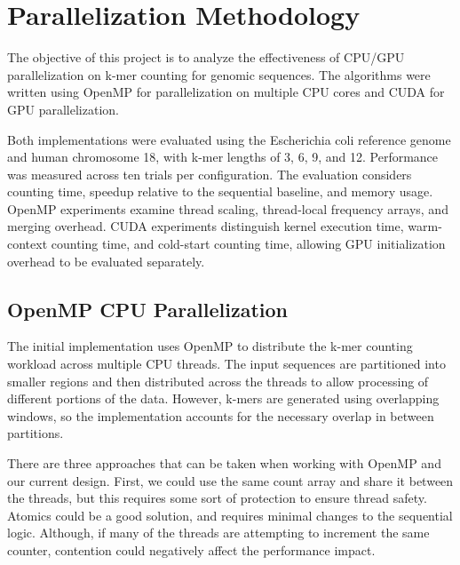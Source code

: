 \documentclass{article}
\begin{document}
\section{Parallelization Methodology}

\vspace{\baselineskip}

The objective of this project is to analyze the effectiveness of CPU/GPU parallelization on k-mer counting for genomic sequences. 
The algorithms were written using OpenMP for parallelization on multiple CPU cores and CUDA for GPU parallelization. 

\vspace{\baselineskip}


Both implementations were evaluated using the Escherichia coli reference genome and human chromosome 18, with k-mer lengths of 3, 6, 9, and 12. 
Performance was measured across ten trials per configuration. The evaluation considers counting time, speedup relative to the sequential baseline, and memory usage. 
OpenMP experiments examine thread scaling, thread-local frequency arrays, and merging overhead. CUDA experiments distinguish kernel execution time, warm-context counting time, 
and cold-start counting time, allowing GPU initialization overhead to be evaluated separately.

\vspace{\baselineskip}



\subsection{OpenMP CPU Parallelization}

\vspace{\baselineskip}

The initial implementation uses OpenMP to distribute the k-mer counting workload across multiple CPU threads. The input sequences are partitioned 
into smaller regions and then distributed across the threads to allow processing of different portions of the data. However, k-mers are generated using 
overlapping windows, so the implementation accounts for the necessary overlap in between partitions. 

\vspace{\baselineskip}

There are three approaches that can be taken when working with OpenMP and our current design. First, we could use the same count array and 
share it between the threads, but this requires some sort of protection to ensure thread safety. Atomics could be a good solution, and requires 
minimal changes to the sequential logic. Although, if many of the threads are attempting to increment the same counter, contention 
could negatively affect the performance impact. 
\end{document}
